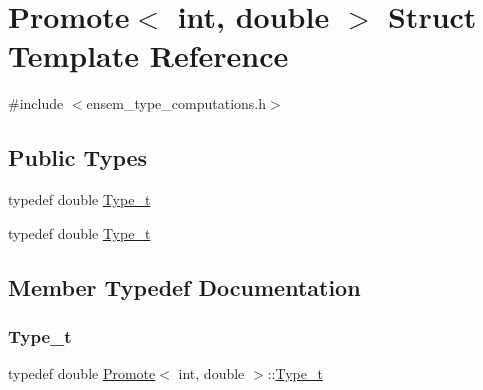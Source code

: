 \hypertarget{structPromote_3_01int_00_01double_01_4}{}\section{Promote$<$ int, double $>$ Struct Template Reference}
\label{structPromote_3_01int_00_01double_01_4}


{\ttfamily \#include $<$ensem\+\_\+type\+\_\+computations.\+h$>$}

\subsection*{Public Types}
\begin{DoxyCompactItemize}
\item 
typedef double \mbox{\hyperlink{structPromote_3_01int_00_01double_01_4_afa774ce31e3f3add209e00c1c5b1c369}{Type\+\_\+t}}
\item 
typedef double \mbox{\hyperlink{structPromote_3_01int_00_01double_01_4_afa774ce31e3f3add209e00c1c5b1c369}{Type\+\_\+t}}
\end{DoxyCompactItemize}


\subsection{Member Typedef Documentation}
\mbox{\label{structPromote_3_01int_00_01double_01_4_afa774ce31e3f3add209e00c1c5b1c369}} 
\subsubsection{\texorpdfstring{Type\_t}{Type\_t}\hspace{0.1cm}{\footnotesize\ttfamily [1/2]}}
{\footnotesize\ttfamily typedef double \mbox{\hyperlink{structPromote}{Promote}}$<$ int, double $>$\+::\mbox{\hyperlink{structPromote_3_01int_00_01double_01_4_afa774ce31e3f3add209e00c1c5b1c369}{Type\+\_\+t}}}

\mbox{\label{structPromote_3_01int_00_01double_01_4_afa774ce31e3f3add209e00c1c5b1c369}} 
